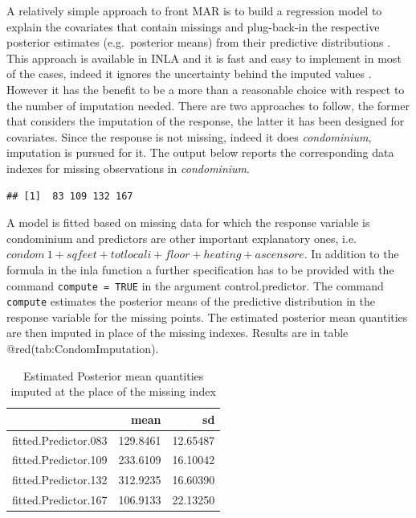\documentclass[
  12pt,
  a4paper,
  oneside]{book}
\newcommand{\passthrough}[1]{#1}
\theoremstyle{definition}
\theoremstyle{definition}
\theoremstyle{definition}
\theoremstyle{remark}
\begin{document}
A relatively simple approach to front MAR is to build a regression model to explain the covariates that contain missings and plug-back-in the respective posterior estimates (e.g.~posterior means) from their predictive distributions \citet{Little}. This approach is available in INLA and it is fast and easy to implement in most of the cases, indeed it ignores the uncertainty behind the imputed values \citep{Bayesian_INLA_Rubio}. However it has the benefit to be a more than a reasonable choice with respect to the number of imputation needed. There are two approaches to follow, the former that considers the imputation of the response, the latter it has been designed for covariates.
Since the response is not missing, indeed it does \emph{condominium}, imputation is pursued for it. The output below reports the corresponding data indexes for missing observations in \emph{condominium}.

\begin{lstlisting}
## [1]  83 109 132 167
\end{lstlisting}

A model is fitted based on missing data for which the response variable is condominium and predictors are other important explanatory ones, i.e.\(condom ~ 1 + sqfeet + totlocali + floor + heating + ascensore\). In addition to the formula in the inla function a further specification has to be provided with the command \passthrough{\lstinline!compute = TRUE!} in the argument control.predictor. The command \passthrough{\lstinline!compute!} estimates the posterior means of the predictive distribution in the response variable for the missing points. The estimated posterior mean quantities are then imputed in place of the missing indexes. Results are in table @red(tab:CondomImputation).

\begin{table}

\caption{\label{tab:condomimputation}Estimated Posterior mean quantities imputed at the place of the missing index}
\centering
\begin{tabular}[t]{lrr}
\toprule
  & mean & sd\\
\midrule
fitted.Predictor.083 & 129.8461 & 12.65487\\
fitted.Predictor.109 & 233.6109 & 16.10042\\
fitted.Predictor.132 & 312.9235 & 16.60390\\
fitted.Predictor.167 & 106.9133 & 22.13250\\
\bottomrule
\end{tabular}
\end{table}
\end{document}
